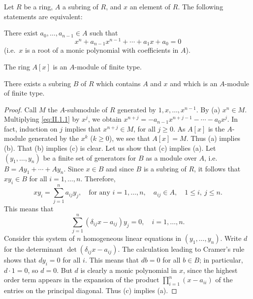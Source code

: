 \clearpage
{}%
\renewcommand{\chaptertitle}{ELEMENTS INTEGRAL OVER A RING}


\begin{theorem}
\label{thm:II.1.1}
Let $R$ be a ring, $A$ a subring of $R$, and $x$ an element of $R$. The
following statements are equivalent:
\begin{alist}
\item There exist $a_{0},\ldots,a_{n-1}\in A$ such that
\begin{equation}
x^{n}+a_{n-1}x^{n-1}+\cdots+a_{1}x+a_{0}=0
\label{eq:II.1.1}
\end{equation}
(i.e.\ $x$ is a root of a monic polynomial with coefficients in $A$).
\item The ring $A[x]$ is an $A$-module of finite type.
\item There exists a subring $B$ of $R$ which contains $A$ and $x$ and which
is an $A$-module of finite type.
\end{alist}
\end{theorem}

\begin{proof}
Call $M$ the $A$-submodule of $R$ generated by $1,x,\ldots,x^{n-1}$. By (a)
$x^{n}\in M$. Multiplying \eqref{eq:II.1.1} by $x^{j}$, we obtain
$x^{n+j}=-a_{n-1}x^{n+j-1}-\cdots-a_{0}x^{j}$. In fact, induction on $j$
implies that $x^{n+j}\in M$, for all $j\geq0$. As $A[x]$ is the $A$-module
generated by the $x^{k}$ ($k\geq0$), we see that $A[x]=M$. Thus (a) implies
(b). That (b) implies (c) is clear. Let us show that (c) implies (a). Let
$(y_{1},\ldots,y_{n})$ be a finite set of generators for $B$ as a module
over $A$, i.e.\ $B=Ay_{1}+\cdots+Ay_{n}$. Since $x\in B$ and since $B$ is a
subring of $R$, it follows that $xy_{i}\in B$ for all $i=1,\ldots,n$.
Therefore,
\[
xy_{i}=\sum_{j=1}^{n}a_{ij}y_{j},\quad\text{for any }i=1,\ldots,n,\quad
a_{ij}\in A,\quad1\leq i,\ j\leq n.
\]
This means that
\[
\sum_{j=1}^{n}\left(\delta_{ij}x-a_{ij}\right)y_{j}=0,
\quad i=1,\ldots,n.
\]
Consider this system of $n$ homogeneous linear equations in
$(y_{1},\ldots,y_{n})$. Write $d$ for the determinant
$\det(\delta_{ij}x-a_{ij})$. The calculation leading to Cramer's rule shows
that $dy_{i}=0$ for all $i$. This means that $db=0$ for all $b\in B$; in
particular, $d\cdot1=0$, so $d=0$. But $d$ is clearly a monic polynomial in
$x$, since the highest order term appears in the expansion of the product
$\prod_{i=1}^{n}(x-a_{ii})$ of the entries on the principal diagonal. Thus
(c) implies (a).
\end{proof}

